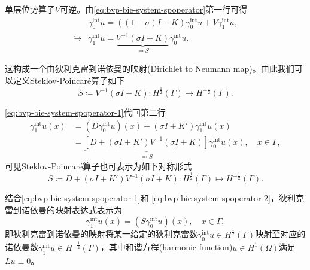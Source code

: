 单层位势算子$V$可逆。由\eqref{eq:bvp-bie-system-spoperator}第一行可得
\begin{equation}
  \label{eq:bvp-bie-system-spoperator-1}
\begin{split}
    & \gamma_{0}^{\text{int}} u = \left( \left( 1- \sigma \right) I - K \right) \gamma_{0}^{\text{int}} u + V \gamma_{1}^{\text{int}} u, \\
    \hookrightarrow & \gamma_{1}^{\text{int}} u = \underbrace{
    V^{-1} \left( \sigma I + K \right)
    }_{\eqqcolon S} \gamma_{0}^{\text{int}} u.
\end{split}
\end{equation}

这构成一个由狄利克雷到诺依曼的映射(Dirichlet to Neumann map)\citep{Behrndt:2015kq}。由此我们可以定义Steklov-Poincaré算子如下
\begin{equation}
  \label{eq:bvp-bie-system-spoperator-def}
  S \coloneqq V^{-1} \left( \sigma I + K \right) : H^{\frac{1}{2}}(\Gamma) \mapsto H^{-\frac{1}{2}}(\Gamma).
\end{equation}

\eqref{eq:bvp-bie-system-spoperator-1}代回第二行
\begin{equation}
  \label{eq:bvp-bie-system-spoperator-2}
  \begin{split}
    \gamma_{1}^{\text{int}} u(x) &=
    \left( D \gamma_{0}^{\text{int}} u \right)(x)
    + \left( \sigma I + K' \right) \gamma_{1}^{\text{int}} u(x) \\
    & = \underbrace{
    \left[
    D + \left( \sigma I + K' \right) V^{-1} \left( \sigma I + K \right)
    \right]
    }_{\eqqcolon S}
    \gamma_{0}^{\text{int}} u(x), \quad x \in \Gamma,
  \end{split}
\end{equation}
可见Steklov-Poincaré算子也可表示为如下对称形式
\begin{equation}
    \label{eq:bvp-bie-system-spoperator-def-sym}
    S \coloneqq     D + \left( \sigma I + K' \right) V^{-1} \left( \sigma I + K \right) : H^{\frac{1}{2}}(\Gamma) \mapsto H^{-\frac{1}{2}}(\Gamma).
\end{equation}

结合\eqref{eq:bvp-bie-system-spoperator-1}和  \eqref{eq:bvp-bie-system-spoperator-2}，狄利克雷到诺依曼的映射表达式表示为
\begin{equation}
  \label{eq:bie-map-dton}
  \gamma_{1}^{\text{int}} u(x) = \left( S \gamma_{0}^{\text{int}} u \right)(x), \quad x \in \Gamma,
\end{equation}
即狄利克雷到诺依曼的映射将某一给定的狄利克雷数$\gamma_{0}^{\text{int}} u \in H^{\frac{1}{2}}(\Gamma)$映射至对应的诺依曼数$\gamma_{1}^{\text{int}} u \in H^{-\frac{1}{2}}(\Gamma)$，其中和谐方程(harmonic function)$u \in H^{1}(\Omega)$满足$L u \equiv 0$。


